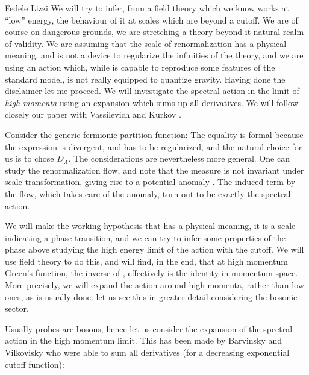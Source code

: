 \begin{artengenv}{Fedele Lizzi}
We will try to infer, from a field theory which we know works at ``low'' energy, the behaviour of it at scales which are beyond a cutoff. We are of course on dangerous grounds, we are stretching a theory beyond it natural realm of validity. We are assuming that the scale of renormalization has a physical meaning, and is not a device to regularize the infinities of the theory, and we are using an action which, while is capable to reproduce some features of the standard model, is not really equipped to quantize gravity.
Having done the disclaimer let me proceed. We will investigate the spectral action in the limit of \emph{high momenta} using an expansion which sums up all derivatives. We will follow closely our paper with Vassilevich and Kurkov \parencite*{Kuliva}.

Consider the generic fermionic partition function:
 The equality is formal because the expression is divergent, and has to be regularized, and the natural choice for us is to chose $D_\Lambda$. The considerations are nevertheless more general. One can study the renormalization flow, and note that the measure is not invariant under scale transformation, giving rise to a potential anomaly \parencite{Andrianov:2010nr, Andrianov:2011bc}.
The induced term by the flow, which takes care of the anomaly, turn out to be exactly the spectral action.

We will make the working hypothesis that \formu{\Lambda} has a physical meaning, it is a scale indicating a phase transition, and we can try to infer some properties of the phase above \formu{\Lambda} studying the high energy limit of the action with the cutoff. We will use field theory to do this, and will find, in the end, that at high momentum Green's function, the inverse of , effectively is the identity in momentum space. More precisely, we will expand the action around high momenta, rather than low ones, as is usually done. let us see this in greater detail considering the bosonic sector.



Usually probes are bosons, hence let us consider the expansion of the spectral action in the high momentum limit.
This has been made by Barvinsky and Vilkovisky \parencite*{Barvinsky:1990up} who were able to sum all derivatives (for a decreasing exponential cutoff function):


\end{artengenv}
